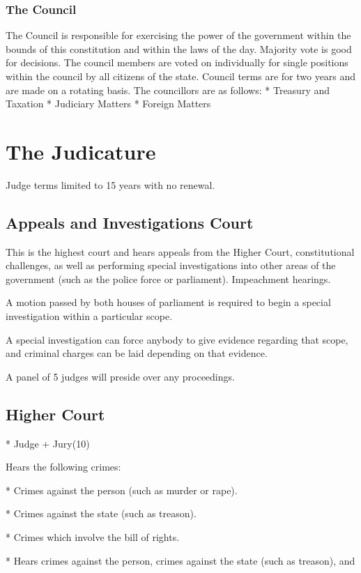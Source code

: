 \documentclass[a4paper]{report}
\begin{document}
\subsection{The Council}
The Council is responsible for exercising the power of the government within the bounds of this constitution and within the laws of the day. Majority vote is good for decisions. The council members are voted on individually for single positions within the council by all citizens of the state. Council terms are for two years and are made on a rotating basis. The councillors are as follows:
* Treasury and Taxation
* Judiciary Matters
* Foreign Matters

\chapter{The Judicature}

Judge terms limited to 15 years with no renewal.

\section{Appeals and Investigations Court}

This is the highest court and hears appeals from the Higher Court, constitutional challenges, as well as performing special investigations into other areas of the government (such as the police force or parliament). Impeachment hearings.

A motion passed by both houses of parliament is required to begin a special investigation within a particular scope.

A special investigation can force anybody to give evidence regarding that scope, and criminal charges can be laid depending on that evidence.

A panel of 5 judges will preside over any proceedings.

\section{Higher Court}

* Judge + Jury(10)

Hears the following crimes:

* Crimes against the person (such as murder or rape).

* Crimes against the state (such as treason).

* Crimes which involve the bill of rights.

* Hears crimes against the person, crimes against the state (such as treason), and 
\end{document}
